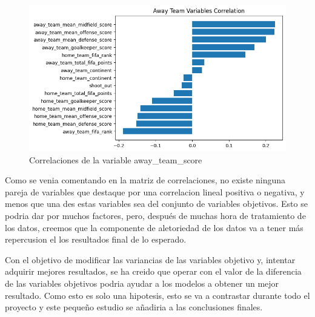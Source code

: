 \begin{figure}[H]
    \centering
    \includegraphics[width=\textwidth]{images/awayTeamCorrelation.png}
    \caption{Correlaciones de la variable away\_team\_score}
    \label{Conjunto-Datos-Away-Correlaciones}
\end{figure}

Como se venia comentando en la matriz de correlaciones, no existe ninguna pareja de variables que destaque por una correlacion lineal positiva o negativa, y menos que una des estas variables sea del conjunto de variables objetivos. Esto se podria dar por muchos factores, pero, después de muchas hora de tratamiento de los datos, creemos que la componente de aletoriedad de los datos va a tener más repercusion el los resultados final de lo esperado. 
\newline

Con el objetivo de modificar las variancias de las variables objetivo y, intentar adquirir mejores resultados, se ha creido que operar con el valor de la diferencia de las variables objetivos podria ayudar a los modelos a obtener un mejor resultado. Como esto es solo una hipotesis, esto se va a contrastar durante todo el proyecto y este pequeño estudio se añadiria a las conclusiones finales. 

\newpage